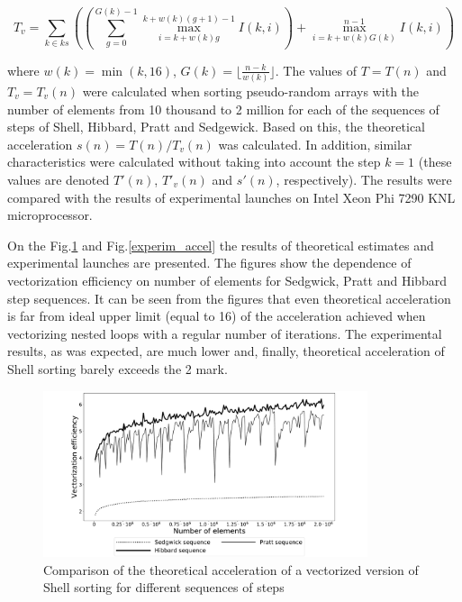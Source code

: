 \documentclass[
11pt,%
tightenlines,%
twoside,%
onecolumn,%
nofloats,%
nobibnotes,%
nofootinbib,%
superscriptaddress,%
noshowpacs,%
centertags]%
{revtex4}
\begin{document}
\begin{equation}
T_v = \sum_{k \in ks}
{
\left(
\left(
\sum_{g = 0}^{G(k) - 1}{\max_{i = k + w(k)g}^{k + w(k)(g + 1) - 1}{I(k, i)}}
\right)
+ \max_{i = k + w(k)G(k)}^{n - 1}{I(k, i)}
\right)
}
\end{equation}

where $ w (k) = \min (k, 16) $, $ G (k) = \lfloor \frac {n - k} {w (k)} \rfloor $. The values of $ T = T (n) $ and $ T_v = T_v (n) $ were calculated when sorting pseudo-random arrays with the number of elements from 10 thousand to 2 million for each of the sequences of steps of Shell, Hibbard, Pratt and Sedgewick. 
Based on this, the theoretical acceleration $ s (n) = T (n) / T_v (n) $ was calculated. 
In addition, similar characteristics were calculated without taking into account the step $ k = 1 $ (these values are denoted $ T '(n) $, $ T'_v (n) $ and $ s' (n) $, respectively). 
The results were compared with the results of experimental launches on Intel Xeon Phi 7290 KNL microprocessor.


On the Fig.\ref{fig:theor_accel} and Fig.\ref{experim_accel} the results of theoretical estimates and experimental launches are presented. 
The figures show the dependence of vectorization efficiency on number of elements for Sedgwick, Pratt and Hibbard step sequences. 
It can be seen from the figures that even theoretical acceleration is far from ideal upper limit (equal to 16) of the acceleration achieved when vectorizing nested loops with a regular number of iterations. The experimental results, as was expected, are much lower and, finally, theoretical acceleration of Shell sorting barely exceeds the  2 mark. 

\begin{figure}[h]
\setcaptionmargin{5mm}
\onelinecaptionstrue  %
\includegraphics[width=0.85\textwidth]{pics/experimental_eff.pdf}
\caption{Comparison of the theoretical acceleration of a vectorized version of Shell sorting for different sequences of steps}\label{fig:theor_accel}
\end{figure}
\end{document}
